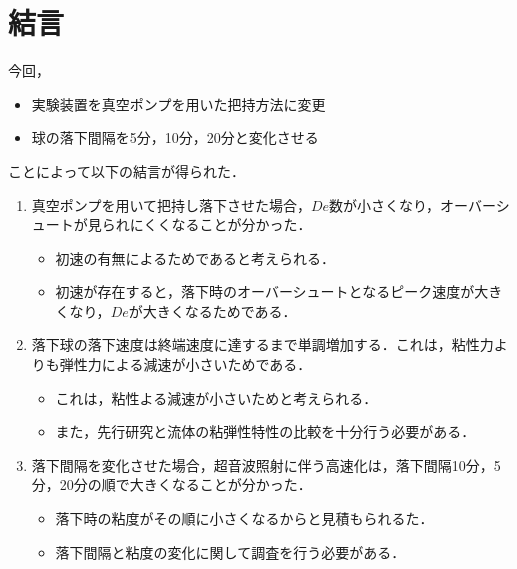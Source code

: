 \clearpage
\section{結言}

今回，
\begin{itemize}
    \item 実験装置を真空ポンプを用いた把持方法に変更
    \item 球の落下間隔を5分，10分，20分と変化させる
\end{itemize}
ことによって以下の結言が得られた．

\begin{enumerate}
    \item 真空ポンプを用いて把持し落下させた場合，$De$数が小さくなり，オーバーシュートが見られにくくなることが分かった．
    \begin{itemize}
        \item 初速の有無によるためであると考えられる．
        \item 初速が存在すると，落下時のオーバーシュートとなるピーク速度が大きくなり，$De$が大きくなるためである．
    \end{itemize}    
    \item 落下球の落下速度は終端速度に達するまで単調増加する．これは，粘性力よりも弾性力による減速が小さいためである．
    \begin{itemize}
        \item これは，粘性よる減速が小さいためと考えられる．
        \item また，先行研究\cite{ref:8}と流体の粘弾性特性の比較を十分行う必要がある．
    \end{itemize}
    \item 落下間隔を変化させた場合，超音波照射に伴う高速化は，落下間隔10分，5分，20分の順で大きくなることが分かった．
    \begin{itemize}
        \item 落下時の粘度がその順に小さくなるからと見積もられるた．
        \item 落下間隔と粘度の変化に関して調査を行う必要がある．
    \end{itemize}
\end{enumerate}
